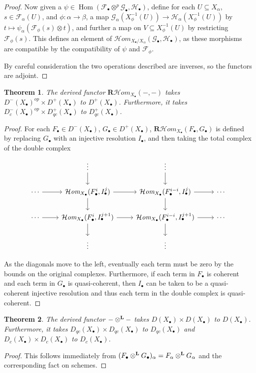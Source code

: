 \documentclass[proquest]{uwthesis}[2014/11/13]
\newtheorem{theorem}{Theorem}[section]
\theoremstyle{definition}
\DeclareMathOperator{\Hom}{Hom}
\newcommand{\cHom}{\mathcal{H} \textit{om}}
\newcommand{\FF}{\mathscr{F}}
\newcommand{\GG}{\mathscr{G}}
\newcommand{\cH}{\mathscr{H}}
\newcommand{\bR}{\textbf{R}}
\newcommand{\otimesL}{\otimes^{\bf L}}
\begin{document}
\begin{proof}
	Now given a $\psi \in \Hom(\FF_\bullet \otimes^p \GG_\bullet, \cH_\bullet)$, define for each $U \subseteq X_\alpha$, $s \in \FF_\alpha(U)$, and $\phi : \alpha \rightarrow \beta$, a map $\GG_\alpha(X_\phi^{-1}(U)) \rightarrow \cH_\alpha(X_\phi^{-1}(U))$ by $t \mapsto \psi_\alpha(\FF_\phi(s) \otimes t)$, and further a map on $V \subseteq X_\phi^{-1}(U)$ by restricting $\FF_\phi(s)$.
	This defines an element of $\cHom_{X_\bullet / X_\alpha}(\GG_\bullet, \cH_\bullet)$, as these morphisms are compatible by the compatibility of $\psi$ and $\FF_\phi$.
	
	By careful consideration the two operations described are inverses, so the functors are adjoint.
\end{proof}

\begin{theorem}
	The derived functor $\bR \cHom_{X_\bullet}(-,-)$ takes $D^-(X_\bullet)^{op} \times D^+(X_\bullet)$ to $D^+(X_\bullet)$.
	Furthermore, it takes $D^-_c(X_\bullet)^{op} \times D^+_{qc}(X_\bullet)$ to $D^+_{qc}(X_\bullet)$.
\end{theorem}
\begin{proof}
	For each $F_\bullet \in D^-(X_\bullet)$, $G_\bullet \in D^+(X_\bullet)$, $\bR \cHom_{X_\bullet}(F_\bullet, G_\bullet)$ is defined by replacing $G_\bullet$ with an injective resolution $I_\bullet$, and then taking the total complex of the double complex
	\[
	\begin{tikzcd}
				{}&	\vdots \arrow{d}	&	\vdots \arrow{d} & \\
		\cdots	\arrow{r}	&	\cHom_{X_\bullet}(F^i_\bullet, I^j_\bullet) \arrow{r} \arrow{d}	&	\cHom_{X_\bullet}(F^{i-i}_\bullet, I^j_\bullet) \arrow{d} \arrow{r}	& \cdots \\
		\cdots	\arrow{r}	&	\cHom_{X_\bullet}(F^i_\bullet, I^{j+1}_\bullet) \arrow{r} \arrow{d}	&	\cHom_{X_\bullet}(F^{i-i}_\bullet, I^{j+1}_\bullet) \arrow{d} \arrow{r}	& \cdots \\
				&	\vdots	&	\vdots &
	\end{tikzcd}
	\]
	
	As the diagonals move to the left, eventually each term must be zero by the bounds on the original complexes.
	Furthermore, if each term in $F_\bullet$ is coherent and each term in $G_\bullet$ is quasi-coherent, then $I_\bullet$ can be taken to be a quasi-coherent injective resolution and thus each term in the double complex is quasi-coherent.
\end{proof}

\begin{theorem}
	The derived functor $-\otimesL-$ takes $D(X_\bullet) \times D(X_\bullet)$ to $D(X_\bullet)$.
	Furthermore, it takes $D_{qc}(X_\bullet) \times D_{qc}(X_\bullet)$ to $D_{qc}(X_\bullet)$ and $D_{c}(X_\bullet) \times D_{c}(X_\bullet)$ to $D_{c}(X_\bullet)$.
\end{theorem}
\begin{proof}
	This follows immediately from $(F_\bullet \otimesL G_\bullet)_\alpha = F_\alpha \otimesL G_\alpha$ and the corresponding fact on schemes.
\end{proof}
\end{document}
